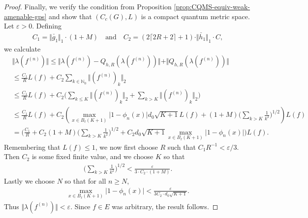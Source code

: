\documentclass[12pt,a4paper,oneside,final,reqno]{amsart}
\newcommand{\N}{\mathbb{N}}
\theoremstyle{plain}
\theoremstyle{definition}
\begin{document}
\begin{proof}
    Finally, we verify the condition from Proposition \ref{prop:CQMS-equiv-weak-amenable-gps} and show that $(C_c(G), L)$ is a compact quantum metric space. 
   Let $\varepsilon > 0$.  
   Defining
   \begin{align*}
       C_1 = \Vert\check{g_1}\Vert_1 \cdot (1+M) \quad \text{and} \quad C_2 = (2\lceil 2R+2\rceil +1) \cdot \Vert \check{h_1}\Vert_1 \cdot C ,
   \end{align*}
   we calculate
   \begin{align*}
       &\Vert \lambda(f^{(n)}) \Vert \leq \Vert \lambda(f^{(n)}) - Q_{h,R}(\lambda(f^{(n)})) \Vert  + \Vert Q_{h,R} (\lambda(f^{(n)})) \Vert \\
       &\leq \frac{C_1}{R}  L(f) +  C_2  \sum_{k \in \N_0} \Vert (f^{(n)})_k \Vert_2        \\
       &\leq  \frac{C_1}{R}  L(f) + C_2   \big( \sum_{k\leq K} \Vert (f^{(n)})_k \Vert_2 + \sum_{k> K} \Vert (f^{(n)})_k \Vert_2 \big)  \\
       &\leq \frac{C_1}{R}  L(f) + C_2 (\max_{x \in B_\ell(K+1)}\vert 1-\phi_n(x) \vert  d_0 \sqrt{K+1}  L(f) + (1+M) \bigg( \sum_{k>K} \frac{1}{k^2} \bigg)^{1/2} ) L(f) \\
       &= \bigg( \frac{C_1}{R} + C_2 (1+M) \bigg( \sum_{k>K} \frac{1}{k^2} \bigg)^{1/2} + C_2 d_0\sqrt{K+1}\max_{x \in B_\ell(K+1)}\vert 1-\phi_n(x) \vert \bigg) L(f).
   \end{align*}
   Remembering that $L(f) \leq 1$, we now first choose $R$ such that $C_1 R^{-1} < \varepsilon/3$. Then $C_2$ is some fixed finite value, and we choose $K$ so that 
   \begin{align*}
       \bigg(\sum_{k>K} \frac{1}{k^2} \bigg)^{1/2} < \frac{\varepsilon}{3 \cdot C_2 \cdot (1+M)}.
   \end{align*}
   Lastly we choose $N$ so that for all $n \geq N$, 
   \begin{align*}
       \max_{x \in B_\ell(K+1)} \vert 1- \phi_n(x) \vert < \frac{\varepsilon}{3 C_2 \cdot d_0\sqrt{K+1}}.
   \end{align*}
   Thus $\Vert \lambda(f^{(n)}) \Vert < \varepsilon$. Since $f \in E$ was arbitrary, the result follows. 
\end{proof}
\end{document}

